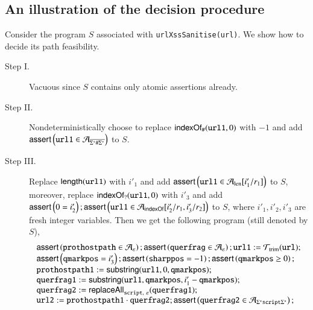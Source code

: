 {\subsection{An illustration of the decision procedure}
	Consider the program $S$ associated with {\tt urlXssSanitise(url)}. %
	We show how to decide its path feasibility. %
	\begin{description}
		\item[Step I.]   Vacuous since $S$ contains only atomic assertions already. %
		\item[Step II.] Nondeterministically choose to replace $\mathsf{indexOf}_\#(\mathtt{url1}, 0)$ with $-1$ and add $\textsf{assert}\left(\mathtt{url1} \in \mathcal{A}_{\overline{\Sigma^*\#\Sigma^*}}\right)$ to $S$.  
		\item[Step III.] Replace $\mathsf{length}(\mathtt{url1})$ with $i'_1$ and add $\textsf{assert}\left(\mathtt{url1} \in \mathcal{A}_{\rm len}[i'_1/r_1]\right)$ to $S$, moreover, replace $\mathsf{indexOf}_?(\mathtt{url1}, 0)$ with $i'_3$ and add $\textsf{assert}\left(0= i'_2\right); \textsf{assert}\left(\mathtt{url1} \in \mathcal{A}_{\mathsf{indexOf}}[i'_2/r_1, i'_3/r_2]\right)$ to $S$, where $i'_1, i'_2, i'_3$ are fresh integer variables. Then we get the following program (still denoted by $S$), 
		\[ 
		\begin{array}{l}
		\ASSERT{\mathtt{prothostpath} \in \NFA_\varepsilon}; \ASSERT{\mathtt{querfrag} \in \NFA_\varepsilon}; \mathtt{url1} := \NFT_{\rm trim}(\mathtt{url}); \\
		\ASSERT{\mathtt{qmarkpos} = i'_3}; \ASSERT{\mathtt{sharppos} =-1 }; \ASSERT{\mathtt{qmarkpos} \ge 0}; \\ 
		\mathtt{prothostpath1} := \substring(\mathtt{url1}, 0, \mathtt{qmarkpos});\\
		\mathtt{querfrag1} := \substring(\mathtt{url1, qmarkpos}, i'_1 - \mathtt{qmarkpos});\\
		\mathtt{querfrag2} := \replaceall_{\mathtt{script},\ \varepsilon}(\mathtt{querfrag1});\\
		\mathtt{url2} := \mathtt{prothostpath1} \concat \mathtt{querfrag2}; \ASSERT{\mathtt{querfrag2} \in  \NFA_{\Sigma^*\mathtt{script}\Sigma^*}};  \\

\end{array}\]
\end{description}}
